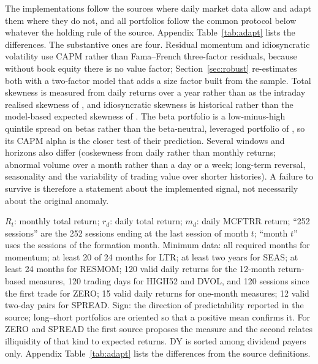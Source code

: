 \documentclass[11pt]{article}
\newcommand{\tabnote}[1]{\par\vspace{3pt}\begin{minipage}{\linewidth}\footnotesize\setstretch{1.0}#1\end{minipage}}
\begin{document}
The implementations follow the sources where daily market data allow and adapt them where they do not, and all
portfolios follow the common protocol below whatever the holding rule of the source. Appendix
Table~\ref{tab:adapt} lists the differences. The substantive ones are four. Residual momentum and idiosyncratic
volatility use CAPM rather than Fama--French three-factor residuals, because without book equity there is no value
factor; Section~\ref{sec:robust} re-estimates both with a two-factor model that adds a size factor built from the
sample. Total skewness is measured from daily returns over a year rather than as the intraday realised skewness of
\citet{amaya2015realized}, and idiosyncratic skewness is historical rather than the model-based expected skewness of
\citet{boyer2010expected}. The beta portfolio is a low-minus-high quintile spread on \citet{dimson1979risk} betas
rather than the beta-neutral, leveraged portfolio of \citet{frazzini2014betting}, so its CAPM alpha is the closer test
of their prediction. Several windows and horizons also differ (coskewness from daily rather than monthly returns;
abnormal volume over a month rather than a day or a week; long-term reversal, seasonality and the variability of
trading value over shorter histories). A failure to survive is therefore a statement about the implemented signal,
not necessarily about the original anomaly.

\begin{table}[!htbp]
\centering\footnotesize
\caption{The 25 characteristics}\label{tab:defs}
\resizebox{\linewidth}{!}{}
\tabnote{$R_t$: monthly total return; $r_d$: daily total return; $m_d$: daily MCFTRR return; ``252 sessions'' are the
252 sessions ending at the last session of month $t$; ``month $t$'' uses the sessions of the formation month. Minimum
data: all required months for momentum; at least 20 of 24 months for LTR; at least two years for SEAS; at least 24
months for RESMOM; 120 valid daily returns for the 12-month return-based measures, 120 trading days for HIGH52 and
DVOL, and 120 sessions since the first trade for ZERO; 15 valid daily returns for one-month measures; 12 valid two-day
pairs for SPREAD. Sign: the direction of predictability reported in the source; long--short portfolios are oriented
so that a positive mean confirms it. For ZERO and SPREAD the first source proposes the measure and the second relates
illiquidity of that kind to expected returns. DY is sorted among dividend payers only. Appendix Table~\ref{tab:adapt}
lists the differences from the source definitions.}
\end{table}
\end{document}
